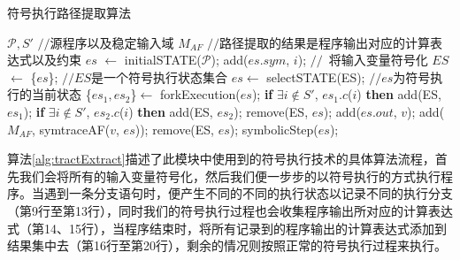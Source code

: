\begin{algorithm}[thb]
  \caption{符号执行路径提取算法}
  \label{alg:tractExtract}
\begin{algorithmic}[1]
\REQUIRE $\mathcal{P}, S'$ \hfill {{\footnotesize$//$}\small  源程序以及稳定输入域}
\ENSURE $M_{AF}$ \hfill {{\footnotesize$//$}\small 路径提取的结果是程序输出对应的计算表达式以及约束} %
    \STATE $es$ $\leftarrow$ initialSTATE($\mathcal{P}$);
      \STATE add($es.sym$, $i$); \hfill {{\footnotesize$//$}\small\ 将输入变量符号化} \label{alg:tractExtract:input}
    \ENDFOR
    \STATE $ES$ $\leftarrow$ \{$es$\}; \hfill {{\footnotesize$//$}\small $ES$是一个符号执行状态集合}
     \label{alg:tractExtract:iter}
      \STATE $es \leftarrow$ selectSTATE(ES); \label{alg:tractExtract:select}  \hfill {{\footnotesize$//$}\small $es$为符号执行的当前状态}
        \STATE \{$es_1,es_2$\}$\leftarrow$ forkExecution($es$);
        \STATE \textbf{if} {$\exists i \notin S'$, $es_1.c$($i$)} \textbf{then} add(ES, $es_1$);
        \STATE \textbf{if} {$\exists i \notin S'$, $es_2.c$($i$)} \textbf{then} add(ES, $es_2$);
        \STATE remove(ES, $es$);   \label{alg:tractExtract:forkend}
      \ENDCASE
        \STATE add($es.out$, $v$); \label{alg:tractExtract:outputv}
      \ENDCASE
          \STATE add($M_{AF}$, symtraceAF($v$, $es$)); \label{alg:tractExtract:recordexp} %
        \ENDFOR
        \STATE remove(ES, $es$);
      \ENDCASE
      \DEFAULT
        \STATE symbolicStep($es$); \label{alg:tractExtract:propagationstep}
      \ENDDEFAULT
      \ENDSWITCH  \label{alg:tractExtract:switend}
    \ENDWHILE \label{alg:tractExtract:iterend}
\end{algorithmic}
\end{algorithm}

算法\ref{alg:tractExtract}描述了此模块中使用到的符号执行技术的具体算法流程，首先我们会将所有的输入变量符号化，然后我们便一步步的以符号执行的方式执行程序。当遇到一条分支语句时，便产生不同的不同的执行状态以记录不同的执行分支（第9行至第13行），同时我们的符号执行过程也会收集程序输出所对应的计算表达式（第14、15行），当程序结束时，将所有记录到的程序输出的计算表达式添加到结果集中去（第16行至第20行），剩余的情况则按照正常的符号执行过程来执行。

